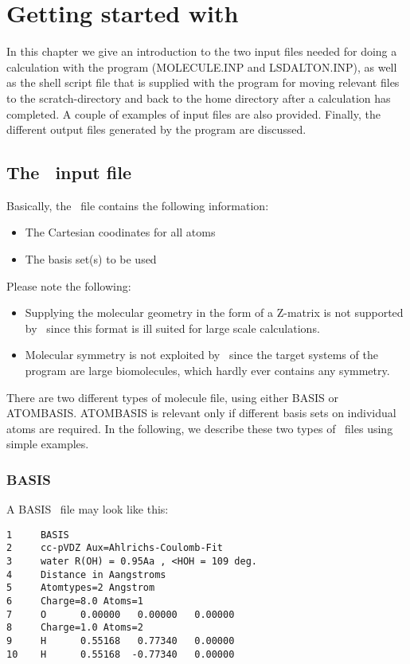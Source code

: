 \chapter{Getting started with {\lsdalton}}\label{ch:starting}

In this chapter we give an introduction to the two input files needed
for doing a calculation with the {\lsdalton} program
(MOLECULE.INP and LSDALTON.INP), as well as the
shell script file that is supplied with the program for moving
relevant files to the scratch-directory and back to the home directory
after a calculation has completed. A couple of examples of
input files  are also provided. Finally, the different output files
generated by the program are discussed.

\section{The \mol\ input file}

Basically, the \mol\ file contains the following information:
\begin{itemize}
\item The Cartesian coodinates for all atoms
\item The basis set(s) to be used
\end{itemize}

Please note the following:
\begin{itemize}
\item Supplying the molecular geometry in the form of a Z-matrix 
is not supported
by \lsdalton\, since this format is ill suited for large scale 
calculations.
\item Molecular symmetry is not exploited by \lsdalton\, since
the target systems of the program are large biomolecules, which
hardly ever contains any symmetry. 
\end{itemize}

There are two different types of molecule file, using either BASIS or ATOMBASIS.
ATOMBASIS is relevant only if different basis sets on individual atoms are required.
In the following, we describe these two types of \mol\ files using simple examples.

\subsection{BASIS}
A BASIS \mol\ file may look like this:
\begin{verbatim}
1     BASIS
2     cc-pVDZ Aux=Ahlrichs-Coulomb-Fit
3     water R(OH) = 0.95Aa , <HOH = 109 deg.
4     Distance in Aangstroms
5     Atomtypes=2 Angstrom
6     Charge=8.0 Atoms=1
7     O      0.00000   0.00000   0.00000
8     Charge=1.0 Atoms=2
9     H      0.55168   0.77340   0.00000
10    H      0.55168  -0.77340   0.00000
\end{verbatim} 

